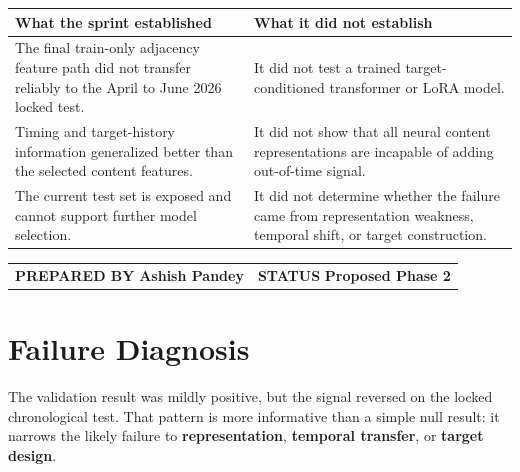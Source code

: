\documentclass[10pt,a4paper]{article}
\begin{document}
\vspace{7mm}
\begin{tabularx}{\textwidth}{@{}Y Y@{}}
  \textbf{\color{Ink}What the sprint established} &
  \textbf{\color{Ink}What it did not establish}\\
  \midrule
  The final train-only adjacency feature path did not transfer reliably to the
  April to June 2026 locked test. &
  It did not test a trained target-conditioned transformer or LoRA model.\\[2mm]
  Timing and target-history information generalized better than the selected
  content features. &
  It did not show that all neural content representations are incapable of adding
  out-of-time signal.\\[2mm]
  The current test set is exposed and cannot support further model selection. &
  It did not determine whether the failure came from representation weakness,
  temporal shift, or target construction.\\
\end{tabularx}

\vfill
\begin{tabularx}{\textwidth}{@{}Y Y@{}}
  {\scriptsize\bfseries\color{Muted}PREPARED BY}\newline
  {\large\bfseries Ashish Pandey} &
  {\scriptsize\bfseries\color{Muted}STATUS}\newline
  {\large\bfseries Proposed Phase 2}\\
\end{tabularx}

\clearpage

\section{Failure Diagnosis}

The validation result was mildly positive, but the signal reversed on the locked
chronological test. That pattern is more informative than a simple null result:
it narrows the likely failure to \textbf{representation}, \textbf{temporal transfer},
or \textbf{target design}.
\end{document}
